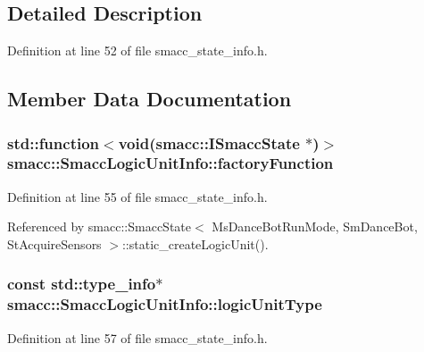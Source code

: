 \subsection{Detailed Description}


Definition at line 52 of file smacc\+\_\+state\+\_\+info.\+h.



\subsection{Member Data Documentation}
\subsubsection[{\texorpdfstring{factory\+Function}{factoryFunction}}]{\setlength{\rightskip}{0pt plus 5cm}std\+::function$<$void({\bf smacc\+::\+I\+Smacc\+State} $\ast$)$>$ smacc\+::\+Smacc\+Logic\+Unit\+Info\+::factory\+Function}\hypertarget{structsmacc_1_1SmaccLogicUnitInfo_a2d4291cbae69ced8549ce7cd6c5e6820}{}\label{structsmacc_1_1SmaccLogicUnitInfo_a2d4291cbae69ced8549ce7cd6c5e6820}


Definition at line 55 of file smacc\+\_\+state\+\_\+info.\+h.



Referenced by smacc\+::\+Smacc\+State$<$ Ms\+Dance\+Bot\+Run\+Mode, Sm\+Dance\+Bot, St\+Acquire\+Sensors $>$\+::static\+\_\+create\+Logic\+Unit().

\subsubsection[{\texorpdfstring{logic\+Unit\+Type}{logicUnitType}}]{\setlength{\rightskip}{0pt plus 5cm}const std\+::type\+\_\+info$\ast$ smacc\+::\+Smacc\+Logic\+Unit\+Info\+::logic\+Unit\+Type}\hypertarget{structsmacc_1_1SmaccLogicUnitInfo_a23f4cb45a6502b1493afec8eb28c9d71}{}\label{structsmacc_1_1SmaccLogicUnitInfo_a23f4cb45a6502b1493afec8eb28c9d71}


Definition at line 57 of file smacc\+\_\+state\+\_\+info.\+h.



